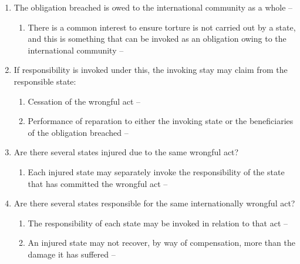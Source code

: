 \begin{enumerate}
\begin{enumerate}
\begin{enumerate}
\begin{enumerate}
            \end{enumerate}
            \item The obligation breached is owed to the international community as a whole -- 
            \begin{enumerate}
                \item There is a common interest to ensure torture is not carried out by a state, and this is something that can be invoked as an obligation owing to the international community -- 
            \end{enumerate}
            \item If responsibility is invoked under this, the invoking stay may claim from the responsible state:
            \begin{enumerate}
                \item Cessation of the wrongful act -- 
                \item Performance of reparation to either the invoking state or the beneficiaries of the obligation breached -- 
            \end{enumerate}
            \item Are there several states injured due to the same wrongful act?
            \begin{enumerate}
                \item Each injured state may separately invoke the responsibility of the state that has committed the wrongful act -- 
            \end{enumerate}
            \item Are there several states responsible for the same internationally wrongful act?
            \begin{enumerate}
                \item The responsibility of each state may be invoked in relation to that act -- 
                \item An injured state may not recover, by way of compensation, more than the damage it has suffered -- 

\end{enumerate}
\end{enumerate}
\end{enumerate}
\end{enumerate}
